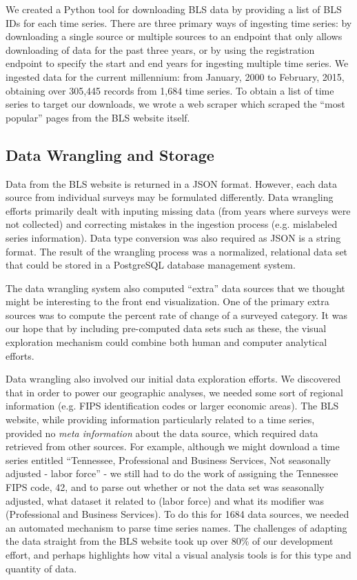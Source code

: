 \documentclass{sigchi}
\begin{document}
We created a Python tool for downloading BLS data by providing a list of BLS IDs for each time series. There are three primary ways of ingesting time series: by downloading a single source or multiple sources to an endpoint that only allows downloading of data for the past three years, or by using the registration endpoint to specify the start and end years for ingesting multiple time series. We ingested data for the current millennium: from January, 2000 to February, 2015, obtaining over 305,445 records from 1,684 time series. To obtain a list of time series to target our downloads, we wrote a web scraper which scraped the ``most popular'' pages from the BLS website itself.

\subsection{Data Wrangling and Storage}

Data from the BLS website is returned in a JSON format. However, each data source from individual surveys may be formulated differently. Data wrangling efforts primarily dealt with inputing missing data (from years where surveys were not collected) and correcting mistakes in the ingestion process (e.g. mislabeled series information). Data type conversion was also required as JSON is a string format. The result of the wrangling process was a normalized, relational data set that could be stored in a PostgreSQL database management system.

The data wrangling system also computed ``extra'' data sources that we thought might be interesting to the front end visualization. One of the primary extra sources was to compute the percent rate of change of a surveyed category. It was our hope that by including pre-computed data sets such as these, the visual exploration mechanism could combine both human and computer analytical efforts.

Data wrangling also involved our initial data exploration efforts. We discovered that in order to power our geographic analyses, we needed some sort of regional information (e.g. FIPS identification codes or larger economic areas). The BLS website, while providing information particularly related to a time series, provided no \textit{meta information} about the data source, which required data retrieved from other sources. For example, although we might download a time series entitled ``Tennessee, Professional and Business Services, Not seasonally adjusted - labor force'' - we still had to do the work of assigning the Tennessee FIPS code, 42, and to parse out whether or not the data set was seasonally adjusted, what dataset it related to (labor force) and what its modifier was (Professional and Business Services). To do this for 1684 data sources, we needed an automated mechanism to parse time series names. The challenges of adapting the data straight from the BLS website took up over 80\% of our development effort, and perhaps highlights how vital a visual analysis tools is for this type and quantity of data.
\end{document}
